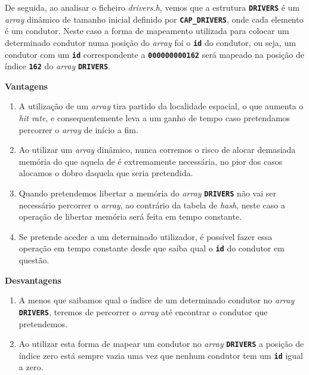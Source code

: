 \documentclass[12pt,a4paper]{report}
\begin{document}
De seguida, ao analisar o ficheiro \textit{drivers.h}, vemos que a estrutura \textbf{\small\texttt{DRIVERS}} é um \textit{array} dinâmico de tamanho inicial definido por \textbf{\small\texttt{CAP\_DRIVERS}}, onde cada elemento é um condutor. Neste caso a forma de mapeamento utilizada para colocar um determinado condutor numa posição do \textit{array} foi o \textbf{\small\texttt{id}} do condutor, ou seja, um condutor com um \textbf{\small\texttt{id}} correspondente a \textbf{\small\texttt{000000000162}} será mapeado na posição de índice \textbf{\small\texttt{162}} do \textit{array} \textbf{\small\texttt{DRIVERS}}.


\normalsize\textbf{Vantagens}
    \begin{enumerate}
        \item A utilização de um \textit{array} tira partido da localidade espacial, o que aumenta o \textit{hit rate}, e consequentemente leva a um ganho de tempo caso pretendamos percorrer o \textit{array} de início a fim.
        
        \item Ao utilizar um \textit{array} dinâmico, nunca corremos o risco de alocar demasiada memória do que aquela de é extremamente necessária, no pior dos casos alocamos o dobro daquela que seria pretendida.
        
        \pagebreak
        \item Quando pretendemos libertar a memória do \textit{array} \textbf{\small\texttt{DRIVERS}} não vai ser necessário percorrer o \textit{array}, ao contrário da tabela de \textit{hash}, neste caso a operação de libertar memória será feita em tempo constante.
        
        \item Se pretende aceder a um determinado utilizador, é possível fazer essa operação em tempo constante desde que saiba qual o \textbf{\small\texttt{id}} do condutor em questão.
    \end{enumerate}

\normalsize\textbf{Desvantagens}
    \begin{enumerate}
        \item A menos que saibamos qual o índice de um determinado condutor no \textit{array} \textbf{\small\texttt{DRIVERS}}, teremos de percorrer o \textit{array} até encontrar o condutor que pretendemos.

        \item Ao utilizar esta forma de mapear um condutor no \textit{array} \textbf{\small\texttt{DRIVERS}} a posição de índice zero está sempre vazia uma vez que nenhum condutor tem um \textbf{\small\texttt{id}} igual a zero.
    \end{enumerate}
\end{document}
